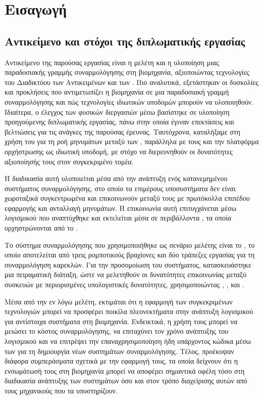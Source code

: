 \chapter{Εισαγωγή}\label{ch:introduction}


\section{Αντικείμενο και στόχοι της διπλωματικής εργασίας}
Αντικείμενο της παρούσας εργασίας είναι η μελέτη και η υλοποίηση μιας παραδοσιακής γραμμής συναρμολόγησης στη βιομηχανία, αξιοποιώντας τεχνολογίες του Διαδικτύου των Αντικειμένων και των . Πιο αναλυτικά, εξετάστηκαν οι δυσκολίες και προκλήσεις που αντιμετωπίζει η βιομηχανία σε μια παραδοσιακή γραμμή συναρμολόγησης και πώς τεχνολογίες ιδιωτικών υποδομών μπορούν να υλοποιηθούν. Ιδιαίτερα, ο έλεγχος των φυσικών διεργασιών μέσω  βασίστηκε σε υλοποίηση προηγούμενης διπλωματικής εργασίας, πάνω στην οποία έγιναν επεκτάσεις και βελτιώσεις για τις ανάγκες της παρούσας έρευνας. Ταυτόχρονα, καταλήξαμε στη χρήση του  για τη ροή μηνυμάτων μεταξύ των , παράλληλα με τους  και την πλατφόρμα ορχήστρωσης  ως ιδιωτική υποδομή, με στόχο να διερευνηθούν οι δυνατότητες αξιοποίησής τους στον συγκεκριμένο τομέα.

Η διαδικασία αυτή υλοποιείται μέσα από την ανάπτυξη ενός κατανεμημένου συστήματος συναρμολόγησης,
στο οποίο τα επιμέρους υποσυστήματα δεν είναι χωροταξικά συγκεντρωμένα και επικοινωνούν μεταξύ τους με
πρωτόκολλα επιπέδου εφαρμογής και ανταλλαγή μηνυμάτων. Η επικοινωνία αυτή επιτυγχάνεται μέσω λογισμικού
που αναπτύχθηκε και εκτελείται μέσα σε περιβάλλοντα , τα οποία ορχηστρώνονται από το .

Το σύστημα συναρμολόγησης που χρησιμοποιήθηκε ως σενάριο μελέτης είναι το
 \cite{thramboulidis_cyber-physical_2018},
το οποίο αποτελείται από τρεις ρομποτικούς βραχίονες και δύο τράπεζες εργασίας για τη συναρμολόγηση καρεκλών.
Για την προσομοίωση του συστήματος, κατασκευάστηκε μια πειραματική διάταξη,
ώστε να μελετηθούν οι δυνατότητες επικοινωνίας μεταξύ συσκευών με περιορισμένες υπολογιστικές δυνατότητες,
χρησιμοποιώντας , ,  και .

Μέσα από την εν λόγω μελέτη, εκτιμάται ότι η εφαρμογή των συγκεκριμένων τεχνολογιών μπορεί να προσφέρει ποικίλα
πλεονεκτήματα στην ανάπτυξη λογισμικού για αντίστοιχα συστήματα στη βιομηχανία. Ενδεικτικά, η χρήση τους μπορεί να μειώσει το κόστος συναρμολόγησης, να επιταχύνει τον χρόνο ανάπτυξης του λογισμικού και να επιτρέψει την επαναχρησιμοποίηση ήδη υπάρχοντος κώδικα μέσω των  για τη δημιουργία νέων συστημάτων συναρμολόγησης. Τέλος, προέκυψαν διάφορα συμπεράσματα σχετικά με την εφαρμογή τους, τα οποία δείχνουν ότι η ενσωμάτωσή τους στη βιομηχανία μπορεί να αποφέρει σημαντικά οφέλη τόσο στη διαδικασία ανάπτυξης των συστημάτων όσο και στον τρόπο διαχείρισης αυτών από τους μηχανικούς που τα υποστηρίζουν.
